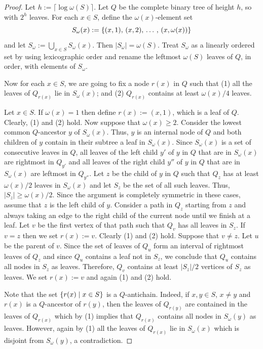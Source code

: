\documentclass[twoside,leqno]{article}
\renewcommand{\geq}{\geqslant}
\DeclarePairedDelimiter{\set}{\{}{\}}
\begin{document}
\begin{proof}
  Let $h:=\lceil\log\omega(S)\rceil$.
  Let $Q$ be the complete binary tree of height $h$, so with $2^h$ leaves.
  For each $x\in S$, define the $\omega(x)$-element set
  \[  S_{\omega}(x):=\set{(x,1),\,(x,2),\,\ldots\,,\,(x,\omega(x))}\]
  and let $S_\omega:=\bigcup_{x\in S}S_{\omega}(x)$.  Then $|S_\omega|=\omega(S)$.  Treat $S_{\omega}$ as a linearly ordered set by using lexicographic order and rename the leftmost $\omega(S)$ leaves of $Q$, in order, with elements of $S_{\omega}$.

  Now for each $x\in S$, we are going to fix a node $r(x)$ in $Q$ such that
  (1) all the leaves of $Q_{r(x)}$ lie in $S_{\omega}(x)$; and
  (2) $Q_{r(x)}$ contains at least $\omega(x)/4$ leaves.

  Let $x\in S$.
  If $\omega(x)=1$ then define $r(x):=(x,1)$, which is a leaf of $Q$.
  Clearly, (1) and (2) hold.
  Now suppose that $\omega(x)\geq2$.
  Consider the lowest common $Q$-ancestor $y$ of $S_{\omega}(x)$.
  Thus, $y$ is an internal node of $Q$ and
  both children of $y$ contain in their subtree a leaf in $S_{\omega}(x)$.
  Since $S_{\omega}(x)$ is a set of consecutive leaves in $Q$,
  all leaves of the left child $y'$ of $y$ in $Q$ that are in $S_{\omega}(x)$ are rightmost in $Q_{y'}$ and
  all leaves of the right child $y''$ of $y$ in $Q$ that are in $S_{\omega}(x)$ are leftmost in $Q_{y''}$.
  Let $z$ be the child of $y$ in $Q$ such that $Q_z$ has at least $\omega(x)/2$ leaves in $S_{\omega}(x)$ and let $S_z$ be the set of all such leaves.
  Thus, $|S_z|\geq \omega(x)/2$.
  Since the argument is completely symmetric in these cases, assume that $z$ is the left child of $y$.
  Consider a path in $Q_z$ starting from $z$ and always taking an edge to the right child of the current node until we finish at a leaf.
  Let $v$ be the first vertex of that path such that $Q_v$ has all leaves in $S_z$.
  If $v=z$ then we set $r(x):=v$. Clearly (1) and (2) hold.
  Suppose that $v\neq z$.
  Let $u$ be the parent of $v$.
  Since the set of leaves of $Q_u$ form an interval of rightmost leaves of $Q_z$ and since $Q_u$ contains a leaf not in $S_z$, we conclude that $Q_u$ contains all nodes in $S_z$ as leaves.
  Therefore, $Q_v$ contains at least $|S_z|/2$ vertices of $S_z$ as leaves.
  We set $r(x):=v$ and again (1) and (2) hold.

  Note that the set $\set{r(x) \mid x\in S}$ is a $Q$-antichain.
  Indeed, if $x,y\in S$, $x\neq y$ and $r(x)$ is a $Q$-ancestor of  $r(y)$, then the leaves of $Q_{r(y)}$ are contained in the leaves of $Q_{r(x)}$ which by (1) implies that $Q_{r(x)}$ contains all nodes in $S_{\omega}(y)$ as leaves.
  However, again by (1) all the leaves of $Q_{r(x)}$ lie in $S_{\omega}(x)$ which is disjoint from $S_{\omega}(y)$, a contradiction.


\end{proof}
\end{document}
